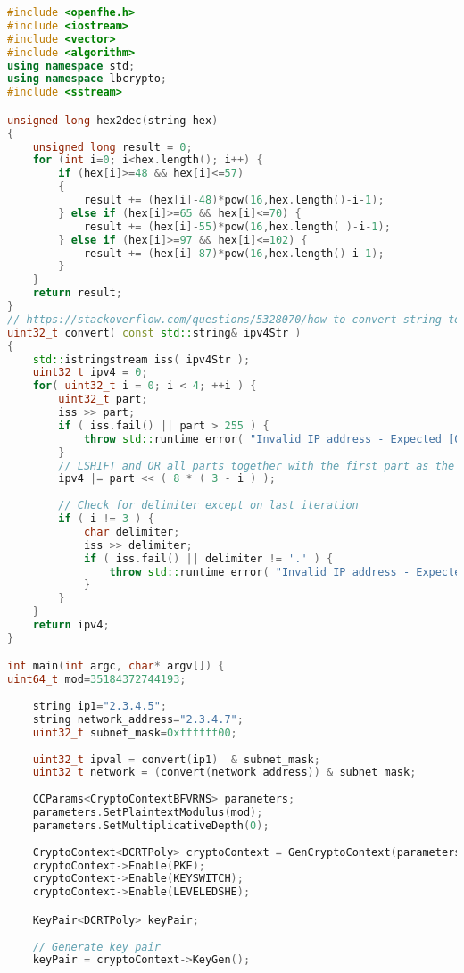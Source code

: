 \documentclass[envcountsame,runningheads,notitlepage]{llncs}
\begin{document}
\begin{lstlisting}[linewidth=\columnwidth,breaklines=true,language=C++]
#include <openfhe.h>
#include <iostream>
#include <vector>
#include <algorithm>
using namespace std;
using namespace lbcrypto;
#include <sstream>

unsigned long hex2dec(string hex)
{
    unsigned long result = 0;
    for (int i=0; i<hex.length(); i++) {
        if (hex[i]>=48 && hex[i]<=57)
        {
            result += (hex[i]-48)*pow(16,hex.length()-i-1);
        } else if (hex[i]>=65 && hex[i]<=70) {
            result += (hex[i]-55)*pow(16,hex.length( )-i-1);
        } else if (hex[i]>=97 && hex[i]<=102) {
            result += (hex[i]-87)*pow(16,hex.length()-i-1);
        }
    }
    return result;
}
// https://stackoverflow.com/questions/5328070/how-to-convert-string-to-ip-address-and-vice-versa
uint32_t convert( const std::string& ipv4Str )
{
    std::istringstream iss( ipv4Str );
    uint32_t ipv4 = 0;
    for( uint32_t i = 0; i < 4; ++i ) {
        uint32_t part;
        iss >> part;
        if ( iss.fail() || part > 255 ) {
            throw std::runtime_error( "Invalid IP address - Expected [0, 255]" );
        }
        // LSHIFT and OR all parts together with the first part as the MSB
        ipv4 |= part << ( 8 * ( 3 - i ) );
 
        // Check for delimiter except on last iteration
        if ( i != 3 ) {
            char delimiter;
            iss >> delimiter;
            if ( iss.fail() || delimiter != '.' ) {
                throw std::runtime_error( "Invalid IP address - Expected '.' delimiter" );
            }
        }
    }
    return ipv4;
}

int main(int argc, char* argv[]) {
uint64_t mod=35184372744193;
 
    string ip1="2.3.4.5";
    string network_address="2.3.4.7";
    uint32_t subnet_mask=0xffffff00;
 
    uint32_t ipval = convert(ip1)  & subnet_mask;
    uint32_t network = (convert(network_address)) & subnet_mask;
 
    CCParams<CryptoContextBFVRNS> parameters;
    parameters.SetPlaintextModulus(mod);
    parameters.SetMultiplicativeDepth(0);
 
    CryptoContext<DCRTPoly> cryptoContext = GenCryptoContext(parameters);
    cryptoContext->Enable(PKE);
    cryptoContext->Enable(KEYSWITCH);
    cryptoContext->Enable(LEVELEDSHE);

    KeyPair<DCRTPoly> keyPair;
 
    // Generate key pair
    keyPair = cryptoContext->KeyGen();
 

\end{lstlisting}
\end{document}
